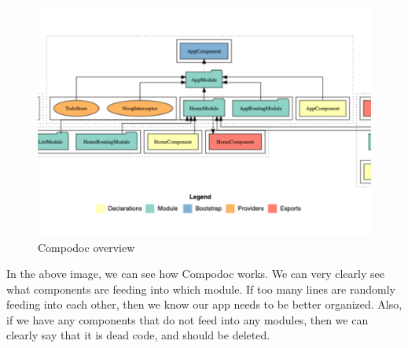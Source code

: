 \begin{figure}[!ht]
\caption{Compodoc overview}
\includegraphics[width=414pt]{graphics/compodoc/compodoc-overview-screenshot.pdf}
\end{figure}

In the above image, we can see how Compodoc works. We can very clearly see what components are feeding into which module. If too many lines are randomly feeding into each other, then we know our app needs to be better organized. Also, if we have any components that do not feed into any modules, then we can clearly say that it is dead code, and should be deleted.

